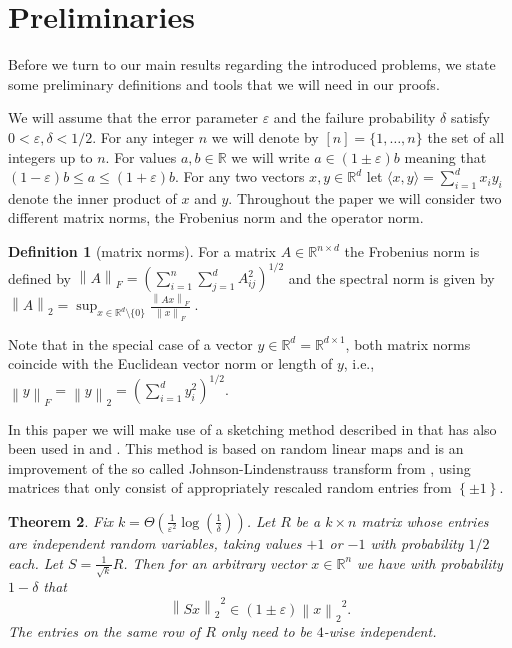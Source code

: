 \documentclass[a4paper,11pt,oneside,english,onecolumn]{article}
\newtheorem{theorem}{Theorem}
\theoremstyle{definition}
\newtheorem{definition}[theorem]{Definition}
\newcommand{\br}[1]{\left\{#1\right\}}                            \renewcommand{\Pr}[1]{\ensuremath{\mathbf{Pr}\left[#1\right]}}
\newcommand{\norm}[1]{\ensuremath{\left\| #1\right\|_2}}
\newcommand{\normF}[1]{\ensuremath{\left\| #1\right\|_F}}
\newcommand{\REAL}{\ensuremath{\mathbb{R}}}
\newcommand{\eps}{\ensuremath{\varepsilon}}
\begin{document}
\section{Preliminaries}
\label{prelim}
Before we turn to our main results regarding the introduced problems, we state some preliminary definitions and tools that we will need in our proofs.

We will assume that the error parameter $\eps$ and the failure probability $\delta$ satisfy $0 < \eps,\delta < 1/2$. For any integer $n$ we will denote by $[n]=\{1,\ldots, n\}$ the set of all integers up to $n$. For values $a,b\in\REAL$ we will write $a\in (1\pm\eps) b$ meaning that $(1-\eps) b \leq a \leq (1+\eps) b$. For any two vectors $x,y\in\REAL^d$ let $\langle x,y \rangle=\sum_{i=1}^d x_iy_i$ denote the inner product of $x$ and $y$. Throughout the paper we will consider two different matrix norms, the Frobenius norm and the operator norm.

\begin{definition}[matrix norms]
For a matrix $A \in \mathbb{R}^{n \times d}$ the Frobenius norm is defined by $\normF{A}=(\sum_{i=1}^n \sum_{j=1}^d A_{ij}^2 )^{1/2}$ and the spectral norm is given by $\norm{A}=\sup_{x\in\mathbb{R}^d\setminus\{0\}} \frac{\normF{Ax}}{\normF{x}}\;.$
\end{definition}
Note that in the special case of a vector $y\in\mathbb{R}^d=\mathbb{R}^{d\times 1}$, both matrix norms coincide with the Euclidean vector norm or length of $y$, i.e., $\normF{y}=\norm{y}=( \sum_{i=1}^d y_{i}^2)^{1/2}.$

In this paper we will make use of a sketching method described in \cite{RandomProj} that has also been used in \cite{ImpLinAlg} and \cite{LinAlgStream}. This method is based on random linear maps and is an improvement of the so called Johnson-Lindenstrauss transform from \cite{JLT}, using matrices that only consist of appropriately rescaled random entries from $\br{\pm 1}$.

\begin{theorem}
\label{th:sketching}
Fix $k = \Theta(\frac{1}{\eps^2} \log\left(\frac{1}{\delta}\right) )$. Let $R$ be a $k \times n$ matrix whose entries are independent random variables, taking values $+1$ or $-1$ with probability $1/2$ each. Let $S=\frac{1}{\sqrt k} R$. Then for an arbitrary vector $x \in \REAL^n$ we have with probability $1 - \delta$ that
$$\norm{Sx}^2 \in (1 \pm \eps)\norm{x}^2.$$
The entries on the same row of $R$ only need to be $4$-wise independent.
\end{theorem}
\end{document}
